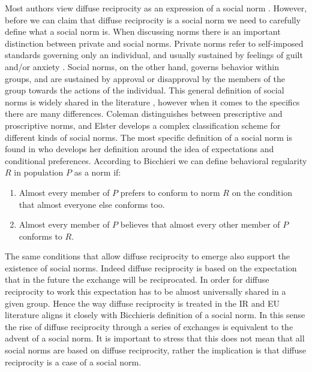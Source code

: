 Most authors view diffuse reciprocity as an expression of a social norm \citep{Keohane1986,Lewis2000,Lewis2005,Diekmann2004}. However, before we can claim that diffuse reciprocity is a social norm we need to carefully define what a social norm is. When discussing norms there is an important distinction between private and social norms. Private norms refer to self-imposed standards governing only an individual, and usually sustained by feelings of guilt and/or anxiety \citep[100]{Elster2007}. Social norms, on the other hand, governs behavior within groups, and are sustained by approval or disapproval by the members of the group towards the actions of the individual. This general definition of social norms is widely shared in the literature \citep{Elster2007,Bicchieri1990,Coleman1990}, however when it comes to the specifics there are many differences. Coleman distinguishes between prescriptive and proscriptive norms, and Elster develops a complex classification scheme for different kinds of social norms. The most specific definition of a social norm is found in \citet{Bicchieri2006} who develops her definition around the idea of expectations and conditional preferences. According to Bicchieri we can define behavioral regularity $R$ in population $P$ as a norm if:

\begin{enumerate}
\item Almost every member of $P$ prefers to conform to norm $R$ on the condition that almost everyone else conforms too.
\item Almost every member of $P$ believes that almost every other member of $P$ conforms to $R$.
\end{enumerate} 

The same conditions that allow diffuse reciprocity to emerge also support the existence of social norms. Indeed diffuse reciprocity is based on the expectation that in the future the exchange will be reciprocated. In order for diffuse reciprocity to work this expectation has to be almost universally shared in a given group. Hence the way diffuse reciprocity is treated in the IR and EU literature aligns it closely with Bicchieris definition of a social norm. In this sense the rise of diffuse reciprocity through a series of exchanges is equivalent to the advent of a social norm. It is important to stress that this does not mean that all social norms are based on diffuse reciprocity, rather the implication is that diffuse reciprocity is a case of a social norm.

